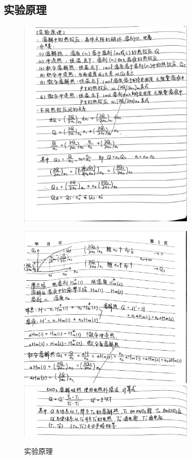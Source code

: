 \documentclass[cn,hazy,pku,12pt,normal,math=newtx,cite=super]{elegantnote}
\begin{document}
\subsection{实验原理}
\begin{figure}[htbp]
    \centering
    \includegraphics[width=0.75\textwidth]{figures/0-2.jpg}
\end{figure}
\begin{figure}[htbp]
    \centering
    \includegraphics[width=0.75\textwidth]{figures/0-3.jpg}
    \includegraphics[width=0.75\textwidth]{figures/0-4.jpg}
    \caption{实验原理}
\end{figure}
\end{document}
